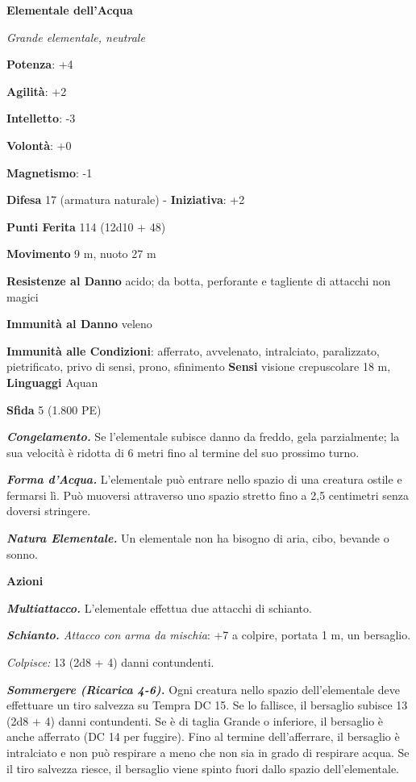 \begin{multicols}{2}
\textbf{Elementale dell'Acqua}

\emph{Grande elementale, neutrale}

\textbf{Potenza}: +4

\textbf{Agilità}: +2

\textbf{Intelletto}: -3

\textbf{Volontà}: +0

\textbf{Magnetismo}: -1

\textbf{Difesa} 17 (armatura naturale) - \textbf{Iniziativa}: +2

\textbf{Punti Ferita} 114 (12d10 + 48)

\textbf{Movimento} 9 m, nuoto 27 m

\textbf{Resistenze al Danno} acido; da botta, perforante e tagliente
di attacchi non magici

\textbf{Immunità al Danno} veleno

\textbf{Immunità alle Condizioni}: afferrato, avvelenato, intralciato,
paralizzato, pietrificato, privo di sensi, prono, sfinimento
\textbf{Sensi} visione crepuscolare 18 m, 
\textbf{Linguaggi} Aquan

\textbf{Sfida} 5 (1.800 PE)\smallskip

\emph{\textbf{Congelamento.}} Se l'elementale subisce danno da freddo,
gela parzialmente; la sua velocità è ridotta di 6 metri fino al termine
del suo prossimo turno.

\emph{\textbf{Forma d'Acqua.}} L'elementale può entrare nello spazio di
una creatura ostile e fermarsi lì. Può muoversi attraverso uno spazio
stretto fino a 2,5 centimetri senza doversi stringere.

\emph{\textbf{Natura Elementale.}} Un elementale non ha bisogno di aria,
cibo, bevande o sonno.

\smallskip\textbf{Azioni}

\emph{\textbf{Multiattacco.}} L'elementale effettua due attacchi di
schianto.

\emph{\textbf{Schianto.} Attacco con arma da mischia}: +7 a colpire,
portata 1 m, un bersaglio.

\emph{Colpisce:} 13 (2d8 + 4) danni contundenti.

\emph{\textbf{Sommergere (Ricarica 4-6).}} Ogni creatura nello spazio
dell'elementale deve effettuare un tiro salvezza su Tempra DC 15. Se lo
fallisce, il bersaglio subisce 13 (2d8 + 4) danni contundenti. Se è di
taglia Grande o inferiore, il bersaglio è anche afferrato (DC 14 per
fuggire). Fino al termine dell'afferrare, il bersaglio è intralciato e
non può respirare a meno che non sia in grado di respirare acqua. Se il
tiro salvezza riesce, il bersaglio viene spinto fuori dallo spazio
dell'elementale.


\end{multicols}
